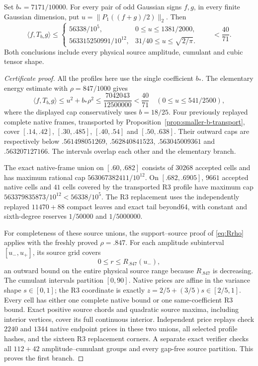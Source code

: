 \begin{theorem}
\label{thm:same-b7171-regions}
Set $b_*=7171/10000$.  For every pair of odd Gaussian signs $f,g$,
in every finite Gaussian dimension, put
$u=\|P_1((f+g)/2)\|_2$.  Then
\[
 \langle f,T_{b_*}g\rangle\le
 \begin{cases}
 56338/10^5,&0\le u\le1381/2000,\\[2pt]
 563315250991/10^{12},&31/40\le u\le\sqrt{2/\pi}.
 \end{cases}
 \qquad <\frac{40}{71}.
\]
Both conclusions include every physical source amplitude, cumulant
and cubic tensor shape.
\end{theorem}
\begin{proof}[Certificate proof]
All the profiles here use the single coefficient $b_*$.
The elementary energy estimate with $\rho=847/1000$ gives
\[
 \langle f,T_{b_*}g\rangle
 \le u^2+b_*\rho^2
 \le\frac{7042043}{12500000}<\frac{40}{71}
 \quad(0\le u\le541/2500),
\]
where the displayed cap conservatively uses $b=18/25$.
Four previously replayed complete native frames, transported by
Proposition~\ref{prop:smaller-b-transport}, cover
$[.14,.42]$, $[.30,.485]$, $[.40,.54]$ and $[.50,.638]$.
Their outward caps are respectively below
$.561498051269$, $.562840841523$, $.563045009361$ and
$.563207127166$.  The intervals overlap each other and the elementary
branch.

The exact native-frame union on $[.60,.682]$ consists of $30268$
accepted cells and has maximum rational cap
$563067382411/10^{12}$.  On $[.682,.6905]$, $9661$ accepted native
cells and $41$ cells covered by the transported R3 profile have
maximum cap $563379835873/10^{12}<56338/10^5$.
The R3 replacement uses the independently replayed $11470+88$
compact leaves and exact tail beyond64, with constant and sixth-degree
reserves $1/50000$ and $1/5000000$.

For completeness of these source unions, the support--source proof
of \eqref{eq:Rrho} applies with the freshly proved $\rho=.847$.
For each amplitude subinterval $[u_-,u_+]$, its source grid covers
\[
 0\le r\le R_{.847}(u_-),
\]
an outward bound on the entire physical source range because
$R_{.847}$ is decreasing.  The cumulant intervals partition $[0,90]$.
Native prices are affine in the variance shape $s\in[0,1]$;
the R3 coordinate is exactly $z=2/5+(3/5)s\in[2/5,1]$.
Every cell has either one complete native bound or one same-coefficient
R3 bound.  Exact positive source chords and quadratic source maxima,
including interior vertices, cover its full continuous interior.
Independent price replays check $2240$ and $1344$ native endpoint
prices in these two unions, all selected profile hashes, and the
sixteen R3 replacement corners.  A separate exact verifier checks
all $112+42$ amplitude--cumulant groups and every gap-free source
partition.  This proves the first branch.


\end{proof}
